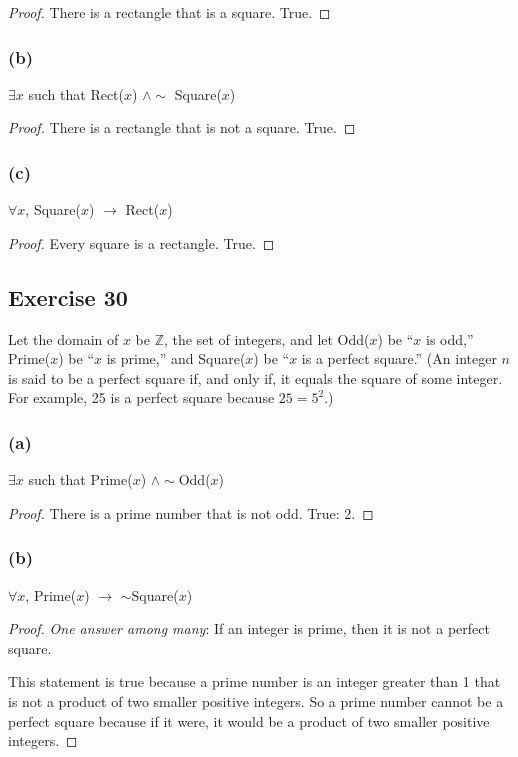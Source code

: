 \documentclass[14pt]{extarticle}
\newcommand{\Z}{\mathbb{Z}}
\newcommand{\fa}{\forall}
\newcommand{\te}{\exists}
\begin{document}
\begin{proof}
    There is a rectangle that is a square. True.
\end{proof}

\subsubsection{(b)}
$\te x$ such that Rect($x$) $\wedge \sim$ Square($x$)

\begin{proof}
    There is a rectangle that is not a square. True.
\end{proof}

\subsubsection{(c)}
$\fa x$, Square($x$) $\to$ Rect($x$)

\begin{proof}
    Every square is a rectangle. True.
\end{proof}

\subsection{Exercise 30}
Let the domain of $x$ be $\Z$, the set of integers, and let Odd($x$) be “$x$ is odd,” Prime($x$) be “$x$ is prime,” and Square($x$) be “$x$ is a perfect square.” (An integer $n$ is said to be a perfect square if, and only if, it equals the square of some integer. For example, 25 is a perfect square because $25 = 5^2$.)

\subsubsection{(a)}
$\te x$ such that Prime($x$) $\wedge\sim$Odd($x$)

\begin{proof}
    There is a prime number that is not odd. True: 2.
\end{proof}

\subsubsection{(b)}
$\fa x$, Prime($x$) $\to$ $\sim$Square($x$)

\begin{proof}
    {\it One answer among many}: If an integer is prime, then it is not a perfect square.

    This statement is true because a prime number is an integer greater than 1 that is not a product of two smaller positive integers. So a prime number cannot be a perfect square because if it were, it would be a product of two smaller positive integers.
\end{proof}
\end{document}
